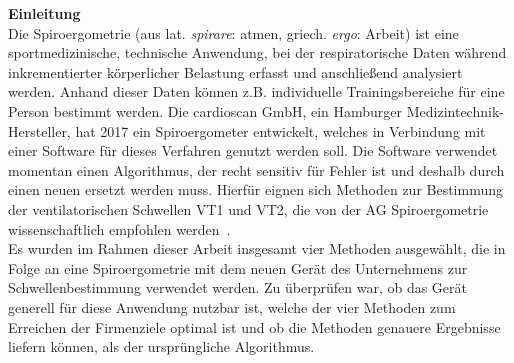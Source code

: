 \textbf{\Large Einleitung}\\

Die Spiroergometrie (aus lat. \textsl{spirare}: atmen, griech. \textsl{ergo}: Arbeit) ist eine sportmedizinische, technische Anwendung, bei der respiratorische Daten während inkrementierter körperlicher Belastung erfasst und anschließend analysiert werden. Anhand dieser Daten können z.B. individuelle Trainingsbereiche für eine Person bestimmt werden. Die cardioscan GmbH, ein Hamburger Medizintechnik-Hersteller, hat 2017 ein Spiroergometer entwickelt, welches in Verbindung mit einer Software für dieses Verfahren genutzt werden soll. Die Software verwendet momentan einen Algorithmus, der recht sensitiv für Fehler ist und deshalb durch einen neuen ersetzt werden muss. Hierfür eignen sich Methoden zur Bestimmung der ventilatorischen Schwellen VT1 und VT2, die von der AG Spiroergometrie wissenschaftlich empfohlen werden~\cite{Westhoff.2012}.\\
Es wurden im Rahmen dieser Arbeit insgesamt vier Methoden ausgewählt, die in Folge an eine Spiroergometrie mit dem neuen Gerät des Unternehmens zur Schwellenbestimmung verwendet werden. Zu überprüfen war, ob das Gerät generell für diese Anwendung nutzbar ist, welche der vier Methoden zum Erreichen der Firmenziele optimal ist und ob die Methoden genauere Ergebnisse liefern können, als der ursprüngliche Algorithmus.\\





